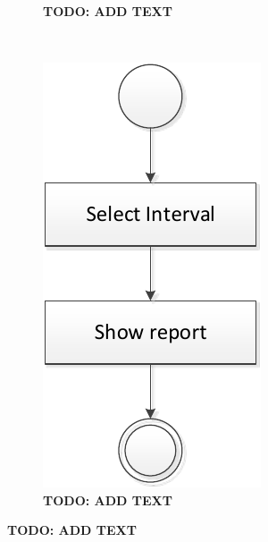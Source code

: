 \begin{figure}
\begin{subfigure}[b]{0.675\textwidth}
	\caption{\textbf{TODO: ADD TEXT}}
	\end{subfigure}
	~
	\begin{subfigure}[b]{0.225\textwidth}
	\includegraphics[width=\textwidth]{img/activity_diagrams/Show_report}
	\caption{\textbf{TODO: ADD TEXT}}
	\end{subfigure}
\end{figure}


